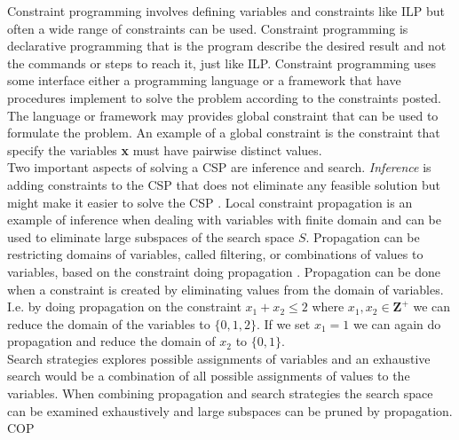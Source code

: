 Constraint programming involves defining variables and constraints like ILP but often a wide range of constraints can 
be used. Constraint programming is declarative programming that is the program describe the desired result 
and not the commands or steps to reach it, just like ILP. Constraint programming uses some interface either a 
programming language or a framework that have procedures implement to solve the problem according to the constraints 
posted. The language or framework may provides global constraint that can be used to formulate the problem. An example 
of a global constraint is the {} constraint that specify the variables \textbf{x} 
must have pairwise distinct values.  \\ 
Two important aspects of solving a CSP are inference and search. \emph{Inference} is adding constraints to the CSP that 
does not eliminate any feasible solution but might make it easier to solve the CSP \cite[p.301]{CPbog}. 
Local constraint propagation is an example of inference when dealing with variables with finite domain and can be used 
to eliminate large subspaces of the search space $S$. Propagation can be restricting domains of variables, called 
filtering, or combinations of values to variables, based on the constraint doing propagation \cite[p. 169]{CPbog}. 
Propagation can be done when a constraint is created by eliminating values from the domain of variables. I.e. by 
doing propagation on the constraint $x_1 + x_2 \leq 2$ where $x_1,x_2 \in \mathbf{Z}^+$ we can reduce the domain of the 
variables to $\{0,1,2\}$. If we set $x_1 =1$ we can again do propagation and reduce the domain of $x_2$ to $\{0,1\}$. 
\\ 
Search strategies explores possible assignments of variables and an exhaustive search would be a combination of all 
possible assignments of values to the variables. When combining propagation and search strategies the search space can 
be examined exhaustively and large subspaces can be pruned by propagation. \\ 
COP